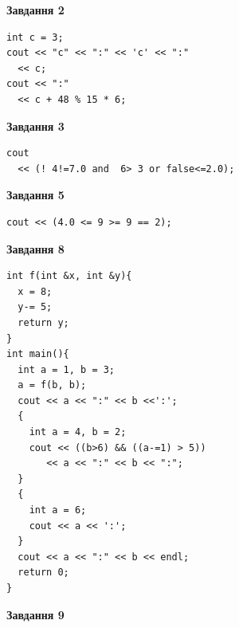 \documentclass[12pt, ukrainian]{article}
\begin{document}
{\begin {large}
\begin{minipage}[t]{7.0cm}
\end{minipage}
\vline \hspace{1mm}
\begin{minipage}[t]{11.0cm}

\begin{center}
\textbf{Завдання 2}
\end{center}
\vspace{-8mm}

\begin{verbatim}
int c = 3;
cout << "c" << ":" << 'c' << ":" 
  << c;
cout << ":" 
  << c + 48 % 15 * 6;
\end{verbatim}



\begin{center}
\textbf{Завдання 3}
\end{center}
\vspace{-8mm}

\begin{verbatim}
cout 
  << (! 4!=7.0 and  6> 3 or false<=2.0);
\end{verbatim}



\begin{center}
\textbf{Завдання 5}
\end{center}
\vspace{-8mm}

\begin{verbatim}
cout << (4.0 <= 9 >= 9 == 2);
\end{verbatim}



\begin{center}
\textbf{Завдання 8}
\end{center}
\vspace{-8mm}

\begin{verbatim}
int f(int &x, int &y){
  x = 8;
  y-= 5;
  return y;
}
int main(){
  int a = 1, b = 3;
  a = f(b, b);
  cout << a << ":" << b <<':';
  {
    int a = 4, b = 2;
    cout << ((b>6) && ((a-=1) > 5))
       << a << ":" << b << ":";
  }
  {
    int a = 6;
    cout << a << ':';
  }
  cout << a << ":" << b << endl;
  return 0;
}
\end{verbatim}

\end{minipage}


\begin{minipage}[t]{7.0cm}

\begin{center}
\textbf{Завдання 9}
\end{center}
\vspace{-8mm}


\end{minipage}
\end{large}}
\end{document}
